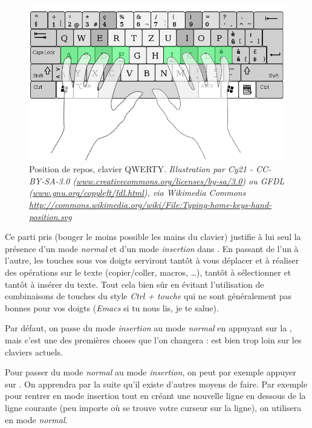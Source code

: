 \begin{figure}%
  \includegraphics[width=\linewidth]{graphics/hand-position.png}
  \caption{Position de repos, clavier QWERTY. \emph{Illustration par Cy21 - CC-BY-SA-3.0 (\url{www.creativecommons.org/licenses/by-sa/3.0}) ou GFDL (\url{www.gnu.org/copyleft/fdl.html}), via Wikimedia Commons \url{http://commons.wikimedia.org/wiki/File:Typing-home-keys-hand-position.svg}}}
  \label{fig:hand-position}
\end{figure}

Ce parti pris (bouger le moins possible les mains du clavier) justifie à lui seul la présence d'un mode \emph{normal} et d'un mode \emph{insertion} dans \vim. En passant de l'un à l'autre, les touches sous vos doigts serviront tantôt à vous déplacer et à réaliser des opérations sur le texte (copier/coller, macros, \ldots), tantôt à sélectionner et tantôt à insérer du texte. Tout cela bien sûr en évitant l'utilisation de combinaisons de touches du style \emph{Ctrl + touche} qui ne sont généralement pas bonnes pour vos doigts (\emph{Emacs} si tu nous lis, je te salue).

Par défaut, on passe du mode \emph{insertion} au mode \emph{normal} en appuyant sur la \ttesc, mais c'est une des premières choses que l'on changera : \ttesc est bien trop loin sur les claviers actuels. 

Pour passer du mode \emph{normal} au mode \emph{insertion}, on peut par exemple appuyer sur \tti. On apprendra par la suite qu'il existe d'autres moyens de faire. Par exemple pour rentrer en mode insertion tout en créant une nouvelle ligne en dessous de la ligne courante (peu importe où se trouve votre curseur sur la ligne), on utilisera \tto en mode \emph{normal}.

